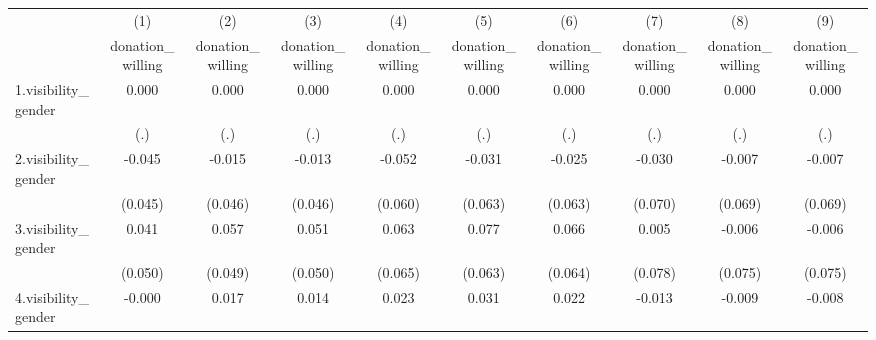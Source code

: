 {
\def\sym#1{\ifmmode^{#1}\else\(^{#1}\)\fi}
\begin{tabular}{l*{9}{c}}
\hline\hline
            &\multicolumn{1}{c}{(1)}&\multicolumn{1}{c}{(2)}&\multicolumn{1}{c}{(3)}&\multicolumn{1}{c}{(4)}&\multicolumn{1}{c}{(5)}&\multicolumn{1}{c}{(6)}&\multicolumn{1}{c}{(7)}&\multicolumn{1}{c}{(8)}&\multicolumn{1}{c}{(9)}\\
            &\multicolumn{1}{c}{donation\_willing}&\multicolumn{1}{c}{donation\_willing}&\multicolumn{1}{c}{donation\_willing}&\multicolumn{1}{c}{donation\_willing}&\multicolumn{1}{c}{donation\_willing}&\multicolumn{1}{c}{donation\_willing}&\multicolumn{1}{c}{donation\_willing}&\multicolumn{1}{c}{donation\_willing}&\multicolumn{1}{c}{donation\_willing}\\
\hline
1.visibility\_gender&       0.000         &       0.000         &       0.000         &       0.000         &       0.000         &       0.000         &       0.000         &       0.000         &       0.000         \\
            &         (.)         &         (.)         &         (.)         &         (.)         &         (.)         &         (.)         &         (.)         &         (.)         &         (.)         \\
[1em]
2.visibility\_gender&      -0.045         &      -0.015         &      -0.013         &      -0.052         &      -0.031         &      -0.025         &      -0.030         &      -0.007         &      -0.007         \\
            &     (0.045)         &     (0.046)         &     (0.046)         &     (0.060)         &     (0.063)         &     (0.063)         &     (0.070)         &     (0.069)         &     (0.069)         \\
[1em]
3.visibility\_gender&       0.041         &       0.057         &       0.051         &       0.063         &       0.077         &       0.066         &       0.005         &      -0.006         &      -0.006         \\
            &     (0.050)         &     (0.049)         &     (0.050)         &     (0.065)         &     (0.063)         &     (0.064)         &     (0.078)         &     (0.075)         &     (0.075)         \\
[1em]
4.visibility\_gender&      -0.000         &       0.017         &       0.014         &       0.023         &       0.031         &       0.022         &      -0.013         &      -0.009         &      -0.008         \\

\end{tabular}}
